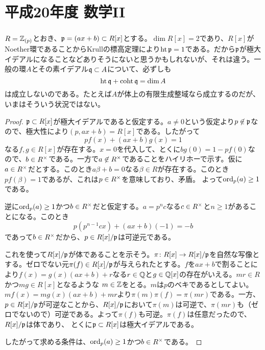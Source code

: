 \section{平成20年度 数学II}

\subsubsection{}%
\begin{rem}
  $R = {\mathbb Z}_{(p)}$とおき、$\mathfrak{p} = (ax+b) \subset R[x]$とする。$\dim R[x] = 2$であり、$R[x]$がNoether環であることからKrullの標高定理により$\operatorname{ht} \mathfrak{p} = 1$である。だから$\mathfrak{p} $が極大イデアルになることなどありそうにないと思うかもしれないが、それは違う。一般の環$A$とその素イデアル$\mathfrak{q} \subset A$について、必ずしも
  \[
  \operatorname{ht} \mathfrak{q} + \operatorname{coht} \mathfrak{q} = \dim A
  \]
  は成立しないのである。たとえば$A$が体上の有限生成整域なら成立するのだが、いまはそういう状況ではない。
\end{rem}
\begin{proof}
$\mathfrak{p} \subset R[x]$が極大イデアルであると仮定する。$a \neq 0$という仮定より$p \not\in \mathfrak{p}$なので、極大性により$(p, ax+b) = R[x]$である。したがって
\[
pf(x) + (ax+b)g(x) = 1
\]
なる$f,g \in R[x]$が存在する。$x=0$を代入して、とくに$bg(0) = 1 - pf(0)$なので、$b \in R^{\times}$である。一方で$a \not\in R^{\times}$であることをハイリホーで示す。仮に$a \in R^{\times}$だとする。このとき$a \beta + b = 0$なる$\beta \in R$が存在する。このとき$p f(\beta) = 1$であるが、これは$p \in R^{\times}$を意味しており、矛盾。
よって$\operatorname{ord}_p(a) \geq 1$である。

逆に$\operatorname{ord}_p(a) \geq 1$かつ$b \in R^{\times}$だと仮定する。$a =  p^n c$なる$c \in R^{\times}$と$n \geq 1$があることになる。このとき
\[
p(p^{n-1}c x) + (ax + b)(-1) = -b
\]
であって$b \in R^{\times}$だから、$p \in R[x]/\mathfrak{p}$は可逆元である。

これを使って$R[x]/\mathfrak{p}$が体であることを示そう。$\pi \colon R[x] \to R[x]/\mathfrak{p}$を自然な写像とする。ゼロでない元$\pi(f) \in R[x]/\mathfrak{p}$が与えられたとする。$f$を$ax +b$で割ることにより$f(x) = g(x)(ax+b) + r$なる$r \in {\mathbb Q}$と$g \in {\mathbb Q}[x]$の存在がいえる。$mr \in R$かつ$mg \in R[x]$となるような
$m \in {\mathbb Z}$をとる。$m$は$p$のベキであるとしてよい。$mf(x) = mg(x)(ax+b) + mr$より$\pi(m)\pi(f) = \pi(m r)$である。一方、$p \in R[x]/\mathfrak{p}$が可逆なことから、$R[x]/\mathfrak{p}$において$\pi(m)$は可逆で、$\pi(mr)$も（ゼロでないので）可逆である。よって$\pi(f)$も可逆。$\pi(f)$は任意だったので、$R[x]/\mathfrak{p}$は体であり、
とくに$\mathfrak{p} \subset R[x]$は極大イデアルである。

したがって求める条件は、$\operatorname{ord}_p(a) \geq 1$かつ$b \in R^{\times}$である。
\end{proof}

